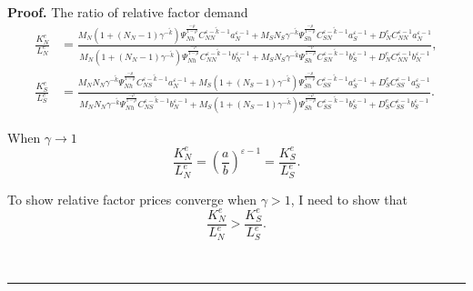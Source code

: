 \documentclass[notitlepage,11pt]{article}%
\newenvironment{proof}[1][Proof]{\noindent \textbf{#1.} }{\  \rule{0.5em}{0.5em}}
\begin{document}
\begin{proof}
The ratio of relative factor demand%
\begin{align*}
\frac{K_{N}^{e}}{L_{N}^{e}}  &  =\frac{M_{N}\left(  1+\left(  N_{N}-1\right)
\gamma^{-\tilde{k}}\right)  \Psi_{Nh}^{\frac{-\rho}{1-\rho}}C_{NN}%
^{\varepsilon-\tilde{k}-1}a_{N}^{\varepsilon-1}+M_{S}N_{S}\gamma^{-\tilde{k}%
}\Psi_{Sh}^{\frac{-\rho}{1-\rho}}C_{SN}^{\varepsilon-\tilde{k}-1}%
a_{S}^{\varepsilon-1}+D_{N}^{e}C_{NN}^{\varepsilon-1}a_{N}^{\varepsilon-1}%
}{M_{N}\left(  1+\left(  N_{N}-1\right)  \gamma^{-\tilde{k}}\right)  \Psi
_{Nh}^{\frac{-\rho}{1-\rho}}C_{NN}^{\varepsilon-\tilde{k}-1}b_{N}%
^{\varepsilon-1}+M_{S}N_{S}\gamma^{-\tilde{k}}\Psi_{Sh}^{\frac{-\rho}{1-\rho}%
}C_{SN}^{\varepsilon-\tilde{k}-1}b_{S}^{\varepsilon-1}+D_{N}^{e}%
C_{NN}^{\varepsilon-1}b_{N}^{\varepsilon-1}},\\
\frac{K_{S}^{e}}{L_{S}^{e}}  &  =\frac{M_{N}N_{N}\gamma^{-\tilde{k}}\Psi
_{Nh}^{\frac{-\rho}{1-\rho}}C_{NS}^{\varepsilon-\tilde{k}-1}a_{N}%
^{\varepsilon-1}+M_{S}\left(  1+\left(  N_{S}-1\right)  \gamma^{-\tilde{k}%
}\right)  \Psi_{Sh}^{\frac{-\rho}{1-\rho}}C_{SS}^{\varepsilon-\tilde{k}%
-1}a_{S}^{\varepsilon-1}+D_{S}^{e}C_{SS}^{\varepsilon-1}a_{S}^{\varepsilon-1}%
}{M_{N}N_{N}\gamma^{-\tilde{k}}\Psi_{Nh}^{\frac{-\rho}{1-\rho}}C_{NS}%
^{\varepsilon-\tilde{k}-1}b_{N}^{\varepsilon-1}+M_{S}\left(  1+\left(
N_{S}-1\right)  \gamma^{-\tilde{k}}\right)  \Psi_{Sh}^{\frac{-\rho}{1-\rho}%
}C_{SS}^{\varepsilon-\tilde{k}-1}b_{S}^{\varepsilon-1}+D_{S}^{e}%
C_{SS}^{\varepsilon-1}b_{S}^{\varepsilon-1}}.
\end{align*}


When $\gamma\rightarrow1$%
\[
\frac{K_{N}^{e}}{L_{N}^{e}}=\left(  \frac{a}{b}\right)  ^{\varepsilon-1}%
=\frac{K_{S}^{e}}{L_{S}^{e}}.
\]


To show relative factor prices converge when $\gamma>1$, I need to show that
\[
\frac{K_{N}^{e}}{L_{N}^{e}}>\frac{K_{S}^{e}}{L_{S}^{e}}.
\]



\end{proof}
\end{document}
